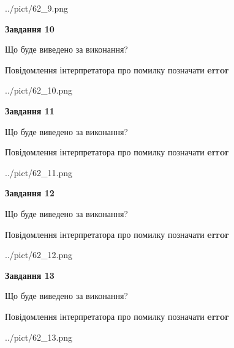 \documentclass[11pt, ukrainian]{article}
\begin{document}
{\begin {large}
\begin{center}
	{../pict/62_9.png}
\end{center}
\newpage

{\begin {center}\textbf{Завдання 10}\end {center}}\par
Що буде виведено за виконання? \par
Повідомлення інтерпретатора про помилку позначати \textbf{error}

\begin{center}
	{../pict/62_10.png}
\end{center}
\newpage

{\begin {center}\textbf{Завдання 11}\end {center}}\par
Що буде виведено за виконання? \par
Повідомлення інтерпретатора про помилку позначати \textbf{error}

\begin{center}
	{../pict/62_11.png}
\end{center}
\newpage

{\begin {center}\textbf{Завдання 12}\end {center}}\par
Що буде виведено за виконання? \par
Повідомлення інтерпретатора про помилку позначати \textbf{error}

\begin{center}
	{../pict/62_12.png}
\end{center}
\newpage

{\begin {center}\textbf{Завдання 13}\end {center}}\par
Що буде виведено за виконання? \par
Повідомлення інтерпретатора про помилку позначати \textbf{error}

\begin{center}
	{../pict/62_13.png}
\end{center}
\newpage


\end{large}}
\end{document}

